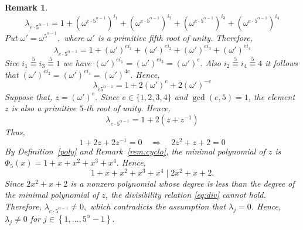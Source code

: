 \documentclass[12pt]{article}
\newtheorem{remA}[propA]{Remark}
\begin{document}
\begin{remA}
\[
\lambda_{e\cdot5^{\alpha-1}}
=
1+\left(\omega^{e\cdot5^{\alpha-1}}\right)^{i_1}
+\left(\omega^{e\cdot5^{\alpha-1}}\right)^{i_2}
+\left(\omega^{e\cdot5^{\alpha-1}}\right)^{i_3}
+\left(\omega^{e\cdot5^{\alpha-1}}\right)^{i_4}
\]
Put
$
\omega'=\omega^{5^{\alpha-1}},
$
where $\omega'$ is a primitive fifth root of unity. Therefore,
\[
\lambda_{e\cdot5^{\alpha-1}}
=
1+(\omega')^{ei_1}
+(\omega')^{ei_2}
+(\omega')^{ei_3}
+(\omega')^{ei_4}
\]
Sice
$
i_1\stackrel{5}{\equiv}i_3\stackrel{5}{\equiv}1
$
we have
$
(\omega')^{ei_1}=(\omega')^{ei_3}=(\omega')^{e}.
$
Also
$
i_2\stackrel{5}{\equiv}i_4\stackrel{5}{\equiv}4
$
it follows that
$
(\omega')^{ei_2}=(\omega')^{ei_4}=(\omega')^{4e}.
$
Hence,
\[
\lambda_{e5^{\alpha-1}}=
1+2(\omega')^{e}+2(\omega')^{-e}
\]
Suppose that,
$
z=(\omega')^e .
$
Since $e\in\{1,2,3,4\}$ and $\gcd(e,5)=1$, the element $z$ is also a primitive $5$-th root of unity. Hence,
\[
\lambda_{e\cdot5^{\alpha-1}}
=
1+2(z+z^{-1})
\]
Thus,
\[
1+2z+2z^{-1}=0 \quad\Longrightarrow\quad
2z^2+z+2=0
\]
By Definition~\ref{poly} and Remark~\ref{rem:cyclo}, the minimal polynomial of $z$ is
$
\Phi_5(x)=1+x+x^2+x^3+x^4.
$
Hence,
\begin{equation}
	1+x+x^2+x^3+x^4\mid 2x^2+x+2.
	\label{eq:div}
\end{equation}
Since $2x^2+x+2$ is a nonzero polynomial whose degree is less than the degree of the minimal polynomial of $z$, the divisibility relation \eqref{eq:div} cannot hold. Therefore,
$
\lambda_{e\cdot5^{\alpha-1}}\neq0,
$
which contradicts the assumption that
$
\lambda_j=0$.
Hence,
$
\lambda_j\neq0
$ for
$j\in\left\{1,\ldots,5^\alpha-1\right\}.
$
 	\end{remA}
\end{document}
